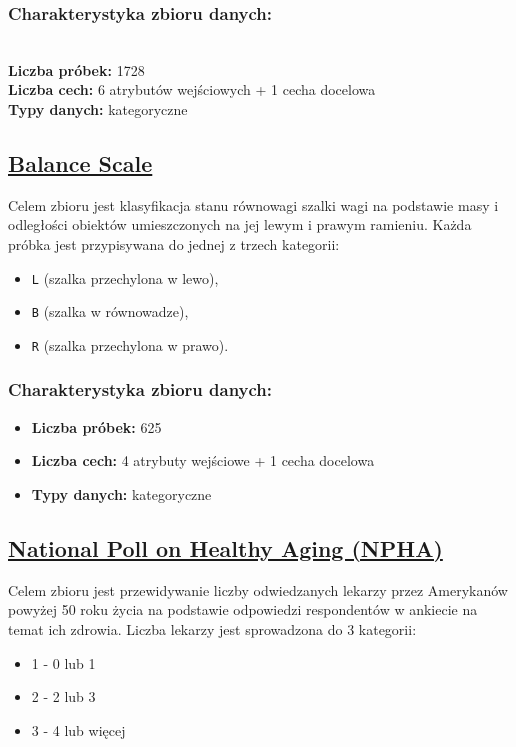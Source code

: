 \documentclass{article}
\begin{document}
\subsubsection*{Charakterystyka zbioru danych:}
\\
\textbf{Liczba próbek:} 1728 \\
\textbf{Liczba cech:} 6 atrybutów wejściowych + 1 cecha docelowa \\
\textbf{Typy danych:} kategoryczne \\

\subsection{\href{https://archive.ics.uci.edu/dataset/12/balance+scale}{Balance Scale}}

Celem zbioru jest klasyfikacja stanu równowagi szalki wagi na podstawie masy i odległości obiektów umieszczonych na jej lewym i prawym ramieniu. Każda próbka jest przypisywana do jednej z trzech kategorii:
\begin{itemize}
    \item \texttt{L} (szalka przechylona w lewo),
    \item \texttt{B} (szalka w równowadze),
    \item \texttt{R} (szalka przechylona w prawo).
\end{itemize}

\subsubsection*{Charakterystyka zbioru danych:}

\begin{itemize}
    \item \textbf{Liczba próbek:} 625
    \item \textbf{Liczba cech:} 4 atrybuty wejściowe + 1 cecha docelowa
    \item \textbf{Typy danych:} kategoryczne
\end{itemize}

\subsection{\href{https://archive.ics.uci.edu/dataset/936/national+poll+on+healthy+aging+(npha)}{National Poll on Healthy Aging (NPHA)}}

Celem zbioru jest przewidywanie liczby odwiedzanych lekarzy przez Amerykanów powyżej 50 roku życia na podstawie odpowiedzi respondentów w ankiecie na temat ich zdrowia. Liczba lekarzy jest sprowadzona do 3 kategorii:
\begin{itemize}
    \item 1 - 0 lub 1
    \item 2 - 2 lub 3
    \item 3 - 4 lub więcej
\end{itemize}
\end{document}
